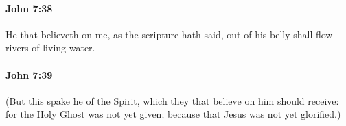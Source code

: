 		\paragraph{John 7:38} %
			\label{JOHN-7-38}

			He that believeth on me, as the scripture hath said, out of his belly shall flow rivers of living water.

			\begin{framed}
			\scriptsize
				\begin{compactdesc}
					\item[SBLG] 
				\end{compactdesc}
			\end{framed}

		\paragraph{John 7:39} %
			\label{JOHN-7-39}

			(But this spake he of the Spirit, which they that believe on him should receive: for the Holy Ghost was not yet given; because that Jesus was not yet glorified.)

